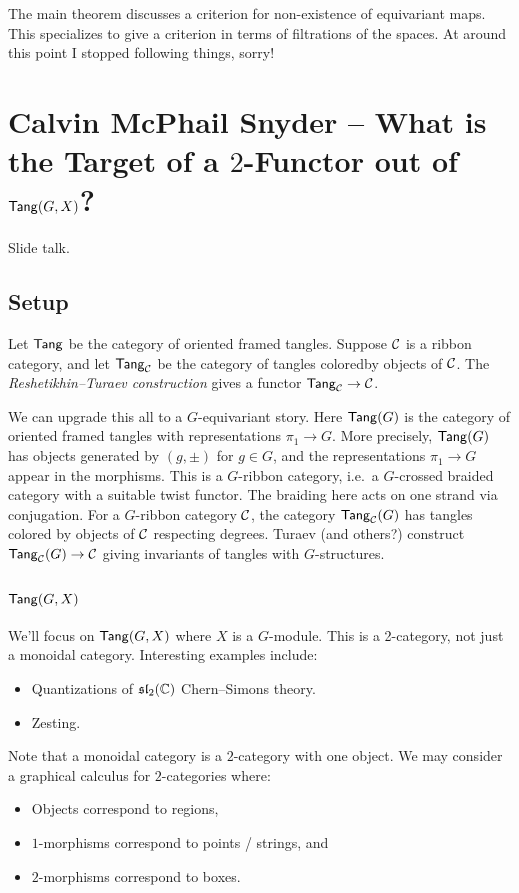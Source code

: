 \documentclass{amsart}
\begin{document}
The main theorem discusses a criterion for non-existence of equivariant maps.
This specializes to give a criterion in terms of filtrations of the spaces.
At around this point I stopped following things, sorry!

\section{Calvin McPhail Snyder -- What is the Target of a $2$-Functor out of \texorpdfstring{$\operatorname{\mathsf{Tang}}(G, X)$}{Tang(G, X)}?}

Slide talk.

\subsection{Setup}

Let $\operatorname{\mathsf{Tang}}$ be the category of oriented framed tangles.
Suppose $\mathcal{C}$ is a ribbon category, and let $\operatorname{\mathsf{Tang}}_{\mathcal{C}}$ be the category of tangles coloredby objects of $\mathcal{C}$.
The \emph{Reshetikhin--Turaev construction} gives a functor $\operatorname{\mathsf{Tang}}_{\mathcal{C}} \to \mathcal{C}$.

We can upgrade this all to a $G$-equivariant story.
Here $\operatorname{\mathsf{Tang}}(G)$ is the category of oriented framed tangles with representations $\pi_1 \to G$.
More precisely, $\operatorname{\mathsf{Tang}}(G)$ has objects generated by $(g, \pm)$ for $g \in G$, and the representations $\pi_1 \to G$ appear in the morphisms.
This is a $G$-ribbon category, i.e.\ a $G$-crossed braided category with a suitable twist functor.
The braiding here acts on one strand via conjugation.
For a $G$-ribbon category $\mathcal{C}$, the category $\operatorname{\mathsf{Tang}}_{\mathcal{C}}(G)$ has tangles colored by objects of $\mathcal{C}$ respecting degrees.
Turaev (and others?) construct $\operatorname{\mathsf{Tang}}_{\mathcal{C}}(G) \to \mathcal{C}$ giving invariants of tangles with $G$-structures.

\subsection{$\operatorname{\mathsf{Tang}}(G, X)$}

We'll focus on $\operatorname{\mathsf{Tang}}(G, X)$ where $X$ is a $G$-module.
This is a 2-category, not just a monoidal category.
Interesting examples include:
\begin{itemize}
  \item Quantizations of $\mathfrak{sl}_2(\mathbb{C})$ Chern--Simons theory.
  \item Zesting.
\end{itemize}

Note that a monoidal category is a $2$-category with one object.
We may consider a graphical calculus for $2$-categories where:
\begin{itemize}
  \item Objects correspond to regions,
  \item $1$-morphisms correspond to points / strings, and
  \item $2$-morphisms correspond to boxes.
\end{itemize}
\end{document}
